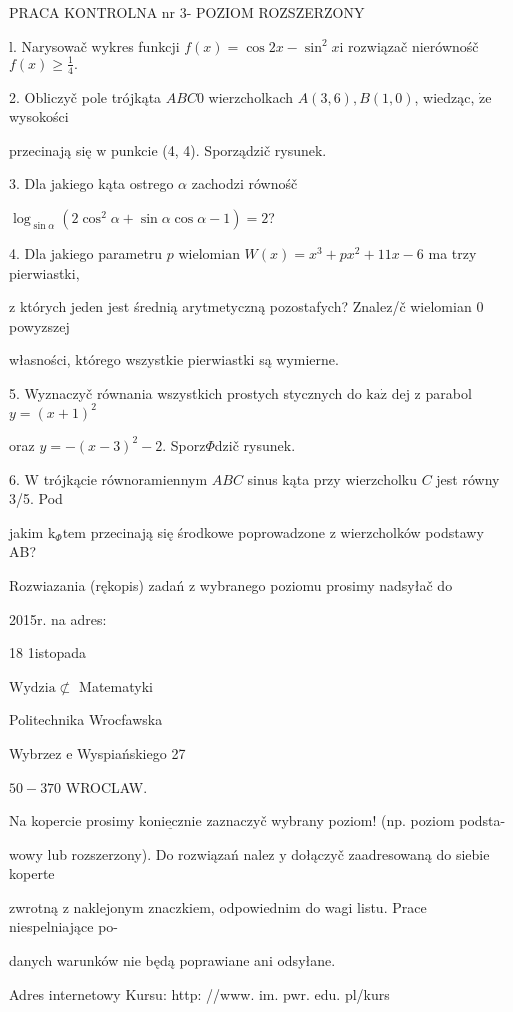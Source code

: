 \documentclass[a4paper,12pt]{article}
\begin{document}
PRACA KONTROLNA nr 3- POZIOM ROZSZERZONY

l. Narysowač wykres funkcji $f(x)=\cos 2x-\sin^{2}x \mathrm{i}$ rozwiązač nierównośč $f(x)\displaystyle \geq\frac{1}{4}.$

2. Obliczyč pole trójkąta $ABC 0$ wierzcholkach $A(3,6), B(1,0)$, wiedząc, $\dot{\mathrm{z}}\mathrm{e}$ wysokości

przecinają się $\mathrm{w}$ punkcie (4, 4). Sporządzič rysunek.

3. Dla jakiego kąta ostrego $\alpha$ zachodzi równośč

$\log_{\sin\alpha}(2\cos^{2}\alpha+\sin\alpha\cos\alpha-1)=2$?

4. Dla jakiego parametru $p$ wielomian $W(x) = x^{3}+px^{2}+11x-6$ ma trzy pierwiastki,

$\mathrm{z}$ których jeden jest średnią arytmetyczną pozostafych? Znalez/č wielomian $0$ powyzszej

własności, którego wszystkie pierwiastki są wymierne.

5. Wyznaczyč równania wszystkich prostych stycznych do $\mathrm{k}\mathrm{a}\dot{\mathrm{z}}$ dej $\mathrm{z}$ parabol $y=(x+1)^{2}$

oraz $y=-(x-3)^{2}-2$. Sporz$\Phi$dzič rysunek.

6. $\mathrm{W}$ trójkącie równoramiennym $ABC$ sinus kąta przy wierzcholku $C$ jest równy 3/5. Pod

jakim $\mathrm{k}_{\Phi}\mathrm{t}\mathrm{e}\mathrm{m}$ przecinają się środkowe poprowadzone $\mathrm{z}$ wierzcholków podstawy AB?

Rozwiazania (rękopis) zadań z wybranego poziomu prosimy nadsyłač do

2015r. na adres:

18 1istopada

$\mathrm{W}\mathrm{y}\mathrm{d}\mathrm{z}\mathrm{i}\mathrm{a}\not\subset$ Matematyki

Politechnika Wrocfawska

Wybrzez $\mathrm{e}$ Wyspiańskiego 27

$50-370$ WROCLAW.

Na kopercie prosimy $\underline{\mathrm{k}\mathrm{o}\mathrm{n}\mathrm{i}\mathrm{e}\mathrm{c}\mathrm{z}\mathrm{n}\mathrm{i}\mathrm{e}}$ zaznaczyč wybrany poziom! (np. poziom podsta-

wowy lub rozszerzony). Do rozwiązań nalez $\mathrm{y}$ dołączyč zaadresowaną do siebie koperte

zwrotną $\mathrm{z}$ naklejonym znaczkiem, odpowiednim do wagi listu. Prace niespelniające po-

danych warunków nie będą poprawiane ani odsyłane.

Adres internetowy Kursu: http: //www. im. pwr. edu. pl/kurs
\end{document}
